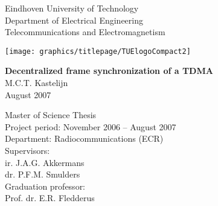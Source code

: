 
\begin{center}
\parbox{17cm}{
  \hspace{1cm}
  \begin{minipage}[c]{.6\textwidth}
    Eindhoven University of Technology\\
    Department of Electrical Engineering\\
    Telecommunications and Electromagnetism
  \end{minipage}
  \begin{minipage}[c]{.4\textwidth}
    \texttt{[image: graphics/titlepage/TUElogoCompact2]}
  \end{minipage}
}
\end{center}
%
\begin{center}
\hspace{2cm}
\begin{minipage}[c]{8cm}
    \vspace{3.5cm}
    \centering
    \Large
    \textbf{Decentralized frame synchronization of a TDMA}\\
    \normalsize
    \vspace{0.5cm}
    M.C.T. Kastelijn\\
    \vspace{5cm}
    August 2007
\end{minipage}
\end{center}
\hspace{1cm}
\begin{minipage}[b]{15cm}
    \vspace{5cm}
    Master of Science Thesis\\
    Project period: November 2006 -- August 2007\\
    Department: Radiocommunications (ECR)\\
    Supervisors:\\
    ir. J.A.G. Akkermans\\
    dr. P.F.M. Smulders\\
    Graduation professor:\\
    Prof. dr. E.R. Fledderus

\end{minipage}
\thispagestyle{empty}
\setcounter{page}{-1}\cleardoublepage

%
%
%
